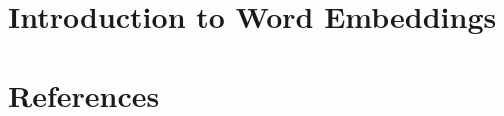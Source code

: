 \section[DNLP]{Introduction to Word Embeddings}


% 
% 

% 
% 
% 

% 



\section[Refs]{References}


